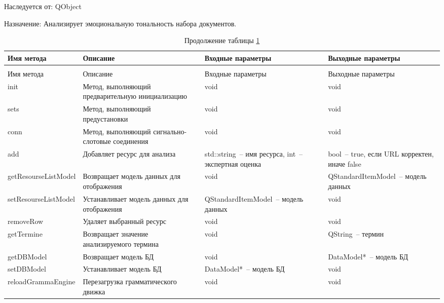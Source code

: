 \documentclass[a4paper,14pt,russian]{extreport}
\begin{document}
Наследуется от: QObject

Назначение: Анализирует эмоциональную тональность набора документов.

\begin{longtable}{|m{3 cm}|m{3 cm}|m{4 cm}|m{4 cm}|}
\caption{Методы класса DocumentsAnalyser\label{tab:documentanalyser}} \\
\hline 
Имя метода & Описание & Входные параметры & Выходные параметры \\
\hline
\endfirsthead
\caption*{Продолжение таблицы \ref{tab:documentanalyser}} \\
\hline
Имя метода & Описание & Входные параметры & Выходные параметры \\
\endhead
init & Метод, выполняющий предварительную инициализацию & void & void \\
\hline
sets & Метод, выполняющий предустановки & void & void \\
\hline
conn & Метод, выполняющий сигнально-слотовые соединения & void & void \\
\hline
add & Добавляет ресурс для анализа & std::string~-- имя ресурса, int~-- экспертная оценка & bool~-- true, если URL корректен, иначе false \\
\hline
{get\-Resourse\-List\-Model} & Возвращает модель данных для отображения & void & {QStandard\-Item\-Model}~-- модель данных \\
\hline
{set\-Resourse\-List\-Model} & Устанавливает модель данных для отображения & {QStandard\-Item\-Model}~-- модель данных & void \\
\hline
{remove\-Row} & Удаляет выбранный ресурс & void & void \\
\hline
{get\-Termine} & Возвращает значение анализируемого термина & void & QString~-- термин \\
\hline
{get\-DBModel} & Возвращает модель БД & void & {Data\-Model*}~-- модель БД \\
\hline
{set\-DBModel} & Устанавливает модель БД & {Data\-Model*}~-- модель БД & void \\
\hline
{reload\-Gramma\-Engine} & Перезагрузка грамматического движка & void & void \\
\hline
\end{longtable}
\end{document}
